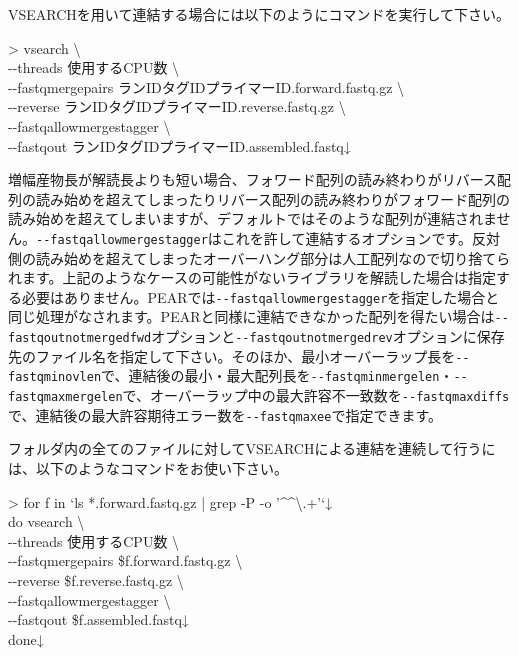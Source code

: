 \documentclass[titlepage,10pt,a4paper]{jsbook}
\newenvironment{cmd}{\begin{oframed}\raggedright\ttfamily\footnotesize\setlength{\baselineskip}{1.4em}}{\end{oframed}\vspace{-1em}}
\begin{document}
VSEARCHを用いて連結する場合には以下のようにコマンドを実行して下さい。

\begin{cmd}
{\textgreater} vsearch {\textbackslash}\\
{-}{-}threads 使用するCPU数 {\textbackslash}\\
{-}{-}fastq{\textunderscore}mergepairs ランID{\textunderscore}{\textunderscore}タグID{\textunderscore}{\textunderscore}プライマーID.forward.fastq.gz {\textbackslash}\\
{-}{-}reverse ランID{\textunderscore}{\textunderscore}タグID{\textunderscore}{\textunderscore}プライマーID.reverse.fastq.gz {\textbackslash}\\
{-}{-}fastq{\textunderscore}allowmergestagger {\textbackslash}\\
{-}{-}fastqout ランID{\textunderscore}{\textunderscore}タグID{\textunderscore}{\textunderscore}プライマーID.assembled.fastq↓
\end{cmd}

増幅産物長が解読長よりも短い場合、フォワード配列の読み終わりがリバース配列の読み始めを超えてしまったりリバース配列の読み終わりがフォワード配列の読み始めを超えてしまいますが、デフォルトではそのような配列が連結されません。\texttt{{-}{-}fastq{\textunderscore}allowmergestagger}はこれを許して連結するオプションです。反対側の読み始めを超えてしまったオーバーハング部分は人工配列なので切り捨てられます。上記のようなケースの可能性がないライブラリを解読した場合は指定する必要はありません。PEARでは\texttt{{-}{-}fastq{\textunderscore}allowmergestagger}を指定した場合と同じ処理がなされます。PEARと同様に連結できなかった配列を得たい場合は\texttt{{-}{-}fastqout{\textunderscore}notmerged{\textunderscore}fwd}オプションと\texttt{{-}{-}fastqout{\textunderscore}notmerged{\textunderscore}rev}オプションに保存先のファイル名を指定して下さい。そのほか、最小オーバーラップ長を\texttt{{-}{-}fastq{\textunderscore}minovlen}で、連結後の最小・最大配列長を\texttt{{-}{-}fastq{\textunderscore}minmergelen}・\texttt{{-}{-}fastq{\textunderscore}maxmergelen}で、オーバーラップ中の最大許容不一致数を\texttt{{-}{-}fastq{\textunderscore}maxdiffs}で、連結後の最大許容期待エラー数を\texttt{{-}{-}fastq{\textunderscore}maxee}で指定できます。

フォルダ内の全てのファイルに対してVSEARCHによる連結を連続して行うには、以下のようなコマンドをお使い下さい。

\begin{cmd}
{\textgreater} for f in `ls *.forward.fastq.gz | grep -P -o '{\textasciicircum}{\lbrack}{\textasciicircum}{\textbackslash}.{\rbrack}+'`↓\\
do vsearch {\textbackslash}\\
{-}{-}threads 使用するCPU数 {\textbackslash}\\
{-}{-}fastq{\textunderscore}mergepairs \$f.forward.fastq.gz {\textbackslash}\\
{-}{-}reverse \$f.reverse.fastq.gz {\textbackslash}\\
{-}{-}fastq{\textunderscore}allowmergestagger {\textbackslash}\\
{-}{-}fastqout \$f.assembled.fastq↓\\
done↓
\end{cmd}
\end{document}
